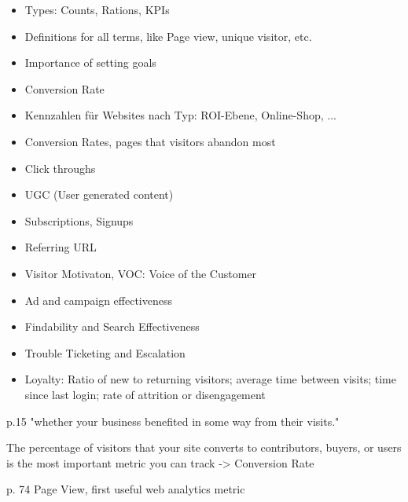 \begin{itemize}
\item Types: Counts, Rations, KPIs
\item Definitions for all terms, like Page view, unique visitor, etc.
\end{itemize}




\begin{itemize}
\item Importance of setting goals
\item Conversion Rate
\item Kennzahlen für Websites nach Typ: ROI-Ebene, Online-Shop, ...
\end{itemize}





\begin{itemize}
\item Conversion Rates, pages that visitors abandon most
\item Click throughs
\item UGC (User generated content)
\item Subscriptions, Signups
\item Referring URL
\item Visitor Motivaton, VOC: Voice of the Customer
\item Ad and campaign effectiveness
\item Findability and Search Effectiveness
\item Trouble Ticketing and Escalation
\item Loyalty: Ratio of new to returning visitors; average time between visits; time since last login; rate of attrition or disengagement
\end{itemize}

p.15 "whether your business benefited in some way from their visits."

The percentage of visitors that your site converts to contributors, buyers, or users is the most important metric you can track -> Conversion Rate

p. 74 Page View, first useful web analytics metric






